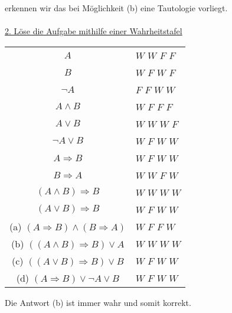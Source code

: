 erkennen wir das bei Möglichkeit (b) eine Tautologie vorliegt.\\
\\
\underline{2. Löse die Aufgabe mithilfe einer Wahrheitstafel}\\
\begin{center}
	\begin{tabular}{cllll}
		\hline
		\multicolumn{1}{c|}{$A$} & \multicolumn{4}{l}{$W$ $W$ $F$ $F$} \\
		\multicolumn{1}{c|}{$B$} & \multicolumn{4}{l}{$W$ $F$ $W$ $F$} \\ 
		\multicolumn{1}{c|}{$\neg A$} & \multicolumn{4}{l}{$F$ $F$ $W$ $W$} \\ 
		\hline
		\multicolumn{1}{c|}{$A \wedge B$} & \multicolumn{4}{l}{$W$ $F$ $F$ $F$} \\
		\multicolumn{1}{c|}{$A \vee B$} & \multicolumn{4}{l}{$W$ $W$ $W$ $F$} \\
		\multicolumn{1}{c|}{$ \neg A \vee B$} & \multicolumn{4}{l}{$W$ $F$ $W$ $W$} \\
		\hline
		\multicolumn{1}{c|}{$ A \Rightarrow B$} & \multicolumn{4}{l}{$W$ $F$ $W$ $W$} \\ 
		\multicolumn{1}{c|}{$ B \Rightarrow A$} & \multicolumn{4}{l}{$W$ $W$ $F$ $W$} \\ 
		\multicolumn{1}{c|}{$ (A \wedge B) \Rightarrow B$} & \multicolumn{4}{l}{$W$ $W$ $W$ $W$} \\ 
		\multicolumn{1}{c|}{$ (A \vee B) \Rightarrow B$} & \multicolumn{4}{l}{$W$ $F$ $W$ $W$} \\ 
		\hline		
		\multicolumn{1}{c|}{(a) $ (A \Rightarrow B) \wedge (B \Rightarrow A)$} & \multicolumn{4}{l}{$W$ $F$ $F$ $W$} \\
		\multicolumn{1}{c|}{(b) $ ((A \wedge B) \Rightarrow B) \vee A$} & \multicolumn{4}{l}{$W$ $W$ $W$ $W$} \\
		\multicolumn{1}{c|}{(c) $((A \vee B) \Rightarrow B) \vee B$} & \multicolumn{4}{l}{$W$ $F$ $W$ $W$} \\
		\multicolumn{1}{c|}{(d) $(A \Rightarrow B ) \vee \neg A \vee B$} & \multicolumn{4}{l}{$W$ $F$ $W$ $W$} \\
		\hline
	\end{tabular}
\end{center}
Die Antwort (b) ist immer wahr und somit korrekt.
 

\newpage
